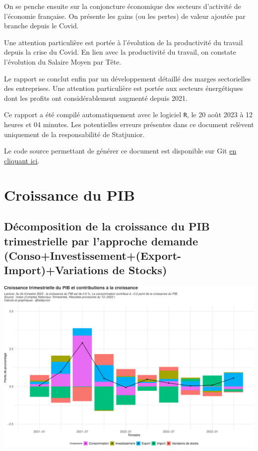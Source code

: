 \documentclass[
  paper=a4,
  ,captions=tableheading
]{scrartcl}
\begin{document}
On se penche ensuite sur la conjoncture économique des secteurs
d'activité de l'économie française. On présente les gains (ou les
pertes) de valeur ajoutée par branche depuis le Covid.

Une attention particulière est portée à l'évolution de la productivité
du travail depuis la crise du Covid. En lien avec la productivité du
travail, on constate l'évolution du Salaire Moyen par Tête.

Le rapport se conclut enfin par un développement détaillé des marges
sectorielles des entreprises. Une attention particulière est portée aux
secteurs énergétiques dont les profits ont considérablement augmenté
depuis 2021.

Ce rapport a été compilé automatiquement avec le logiciel \texttt{R}, le
20 août 2023 à 12 heures et 04 minutes. Les potentielles erreurs
présentes dans ce document relèvent uniquement de la responsabilité de
Statjunior.

Le code source permettant de générer ce document est disponible sur Git
\href{https://github.com/statjunior/Statjunior/tree/main/Conjoncture\%20-\%20comptes\%20trimestriels/}{en
cliquant ici}.

\newpage

\hypertarget{croissance-du-pib}{%
\section{Croissance du PIB}\label{croissance-du-pib}}

\hypertarget{duxe9composition-de-la-croissance-du-pib-trimestrielle-par-lapproche-demande-consoinvestissementexport-importvariations-de-stocks}{%
\subsection{Décomposition de la croissance du PIB trimestrielle par
l'approche demande (Conso+Investissement+(Export-Import)+Variations de
Stocks)}\label{duxe9composition-de-la-croissance-du-pib-trimestrielle-par-lapproche-demande-consoinvestissementexport-importvariations-de-stocks}}

\includegraphics{rapport_pdf_compte_branche_files/figure-latex/unnamed-chunk-2-1.pdf}
\end{document}
